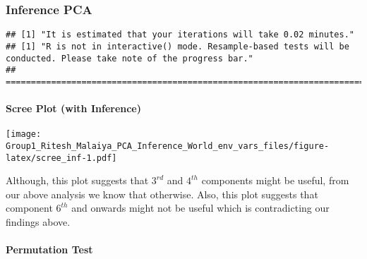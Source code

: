 \documentclass[]{article}
\newenvironment{Shaded}{\begin{snugshade}}{\end{snugshade}}
\newcommand{\DataTypeTok}[1]{\textcolor[rgb]{0.13,0.29,0.53}{#1}}
\newcommand{\KeywordTok}[1]{\textcolor[rgb]{0.13,0.29,0.53}{\textbf{#1}}}
\newcommand{\NormalTok}[1]{#1}
\newcommand{\OperatorTok}[1]{\textcolor[rgb]{0.81,0.36,0.00}{\textbf{#1}}}
\newcommand{\OtherTok}[1]{\textcolor[rgb]{0.56,0.35,0.01}{#1}}
\newcommand{\StringTok}[1]{\textcolor[rgb]{0.31,0.60,0.02}{#1}}
\let\oldparagraph\paragraph
\renewcommand{\paragraph}[1]{\oldparagraph{#1}\mbox{}}
\begin{document}
\hypertarget{inference-pca}{%
\subsubsection{Inference PCA}\label{inference-pca}}

\begin{verbatim}
## [1] "It is estimated that your iterations will take 0.02 minutes."
## [1] "R is not in interactive() mode. Resample-based tests will be conducted. Please take note of the progress bar."
## ===========================================================================
\end{verbatim}

\hypertarget{scree-plot-with-inference}{%
\paragraph{Scree Plot (with
Inference)}\label{scree-plot-with-inference}}

\begin{Shaded}
\end{Shaded}

\texttt{[image: Group1\_Ritesh\_Malaiya\_PCA\_Inference\_World\_env\_vars\_files/figure-latex/scree\_inf-1.pdf]}

Although, this plot suggests that \(3^{rd}\) and \(4^{th}\) components
might be useful, from our above analysis we know that otherwise. Also,
this plot suggests that component \(6^{th}\) and onwards might not be
useful which is contradicting our findings above.

\hypertarget{permutation-test}{%
\paragraph{Permutation Test}\label{permutation-test}}
\end{document}
